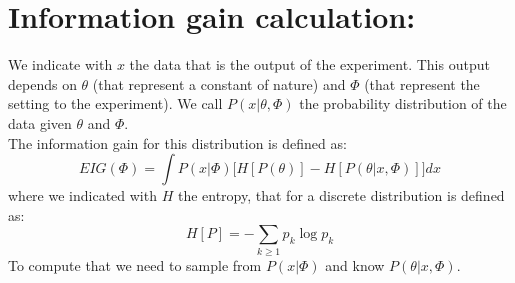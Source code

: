 \documentclass{article}
\begin{document}

\section{Information gain calculation: }
We indicate with $x$ the data that is the output of the experiment. This output depends on $\theta$ (that represent a constant of nature) and $\Phi$ (that represent the setting to the experiment). We call $P(x|\theta,\Phi)$ the probability distribution of the data given $\theta$ and $\Phi$.\\
The information gain for this distribution is defined as: 
\begin{equation}\label{infGain}
EIG(\Phi) =\int P(x|\Phi)\Big[ H[P(\theta)]-H[P(\theta|x,\Phi)]\Big]dx
\end{equation}
where we indicated with $H$ the entropy, that for a discrete distribution is defined as:
\begin{equation}
H[P]=-\sum_{k\geq 1}p_k \log{p_k}
\end{equation}
To compute that we need to sample from $ P(x|\Phi)$ and know $P(\theta|x,\Phi)$.
\end{document}
